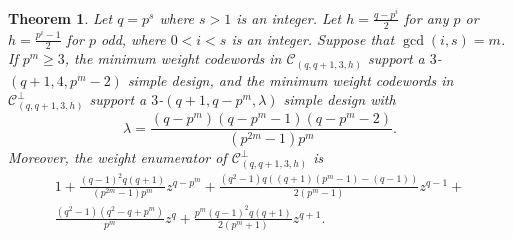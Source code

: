 \documentclass[sn-mathphys-num]{sn-jnl}%
\theoremstyle{thmstyleone}%
\newtheorem{theorem}{Theorem}%
\theoremstyle{thmstyletwo}%
\theoremstyle{thmstylethree}%
\begin{document}
\begin{theorem}
	\label{sec4 thm1}
	Let $q=p^s$ where $s>1$ is an integer. Let $h=\frac{q-p^i}{2}$ for any $p$ or $h=\frac{p^i-1}{2}$ for $p$ odd, where $0<i<s$ is an integer. Suppose that $\gcd(i,s)=m$. If $p^m\ge3$, the minimum weight codewords in $\mathcal{C}_{(q,q+1,3,h)}$ support a $3$-$(q+1,4,p^m-2)$ simple design, and the minimum weight codewords in $\mathcal{C}^\perp_{(q,q+1,3,h)}$ support a $3$-$(q+1,q-p^m,\lambda)$ simple design with
	\begin{equation*}
		\lambda=\frac{(q-p^m)(q-p^m-1)(q-p^m-2)}{(p^{2m}-1)p^{m}}.
	\end{equation*}
	Moreover, the weight enumerator of $\mathcal{C}^\perp_{(q,q+1,3,h)}$ is
	\begin{equation*}
		\begin{aligned}
			1+\frac{(q-1)^2q(q+1)}{(p^{2m}-1)p^{m}}z^{q-p^m}+\frac{(q^2-1)q((q+1)(p^m-1)-(q-1))}{2(p^m-1)}z^{q-1}+\\\frac{(q^2-1)(q^2-q+p^m)}{p^m}z^q+\frac{p^m(q-1)^2q(q+1)}{2(p^m+1)}z^{q+1}.
		\end{aligned}
	\end{equation*}
\end{theorem}
\end{document}
